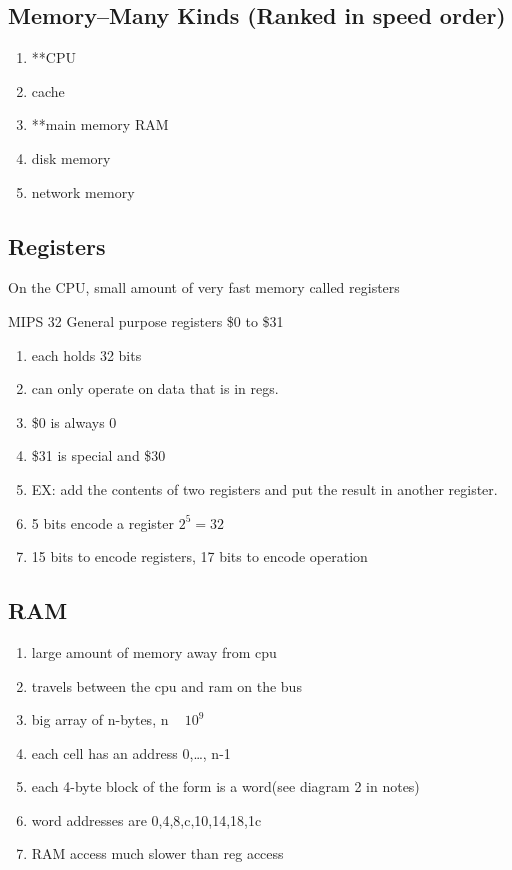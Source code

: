 \documentclass[11pt]{amsart}
\begin{document}
\subsection{Memory--Many Kinds (Ranked in speed order)}
\begin{enumerate}
  \item **CPU
  \item cache
  \item **main memory RAM
  \item disk memory
  \item network memory
\end{enumerate}
\subsection{Registers}
\par On the CPU, small amount of very fast memory called registers
\par MIPS 32 General purpose registers \$0 to \$31
\begin{enumerate}
  \item each holds 32 bits
  \item can only operate on data that is in regs.
  \item \$0 is always 0
  \item \$31 is special and \$30
  \item EX: add the contents of two registers and put the result in another
    register.
  \item 5 bits encode a register $2^5 = 32$
  \item 15 bits to encode registers, 17 bits to encode operation
\end{enumerate}
\subsection{RAM}
\begin{enumerate}
  \item large amount of memory away from cpu
  \item travels between the cpu and ram on the bus
  \item big array of n-bytes, n ~ $10^9$
  \item each cell has an address 0,\dots, n-1
  \item each 4-byte block of the form is a word(see diagram 2 in notes)
  \item word addresses are 0,4,8,c,10,14,18,1c
  \item RAM access much slower than reg access
\end{enumerate}
\end{document}
